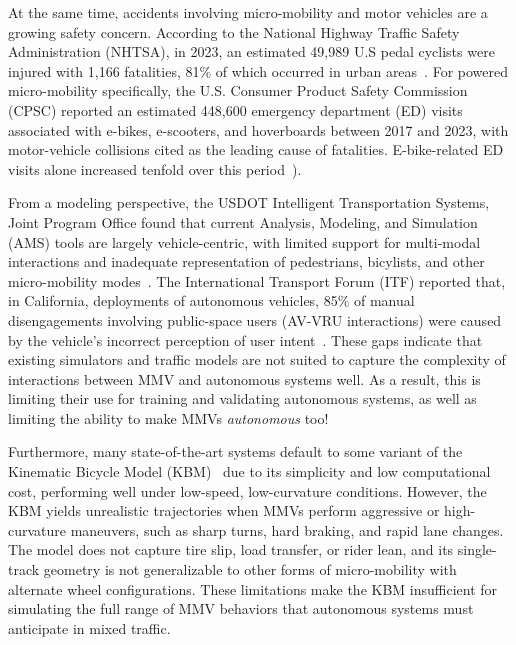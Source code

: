 \documentclass[letterpaper, 10 pt, conference]{ieeeconf}  %
\begin{document}
At the same time, accidents involving micro-mobility and motor vehicles are a growing safety concern. According to the National Highway Traffic Safety Administration (NHTSA), in 2023, an estimated 49,989 U.S pedal cyclists were injured with 1,166 fatalities, 81\% of which occurred in urban areas~\cite{NHTSA2025bicyclists}. For powered micro-mobility specifically, the U.S. Consumer Product Safety Commission (CPSC) reported an estimated 448,600 emergency department (ED) visits associated with e-bikes, e-scooters, and hoverboards between 2017 and 2023, with motor-vehicle collisions cited as the leading cause of fatalities. E-bike-related ED visits alone increased tenfold over this period~\cite{tark2023micromobility}). 

From a modeling perspective, the USDOT Intelligent Transportation Systems, Joint Program Office found that current Analysis, Modeling, and Simulation (AMS) tools are largely vehicle-centric, with limited support for multi-modal interactions and inadequate representation of pedestrians, bicylists, and other micro-mobility modes~\cite{ali2024complete}. The International Transport Forum (ITF) reported that, in California, deployments of autonomous vehicles, 85\% of manual disengagements involving public-space users (AV-VRU interactions) were caused by the vehicle's incorrect perception of user intent~\cite{botero2024lost}. These gaps indicate that existing simulators and traffic models are not suited to capture the complexity of interactions between MMV and autonomous systems well. As a result, this is limiting their use for training and validating autonomous systems, as well as limiting the ability to make MMVs {\em autonomous} too!

Furthermore, many state-of-the-art systems default to some variant of the Kinematic Bicycle Model (KBM)~\cite{mathworksBicycleKinematicModel, autowareMpcLateralController,li2024tactics2d, highwayEnv} due to its simplicity and low computational cost, performing well under low-speed, low-curvature conditions. However, the KBM yields unrealistic trajectories when MMVs perform aggressive or high-curvature maneuvers, such as sharp turns, hard braking, and rapid lane changes. The model does not capture tire slip, load transfer, or rider lean, and its single-track geometry is not generalizable to other forms of micro-mobility with alternate wheel configurations. These limitations make the KBM insufficient for simulating the full range of MMV behaviors that autonomous systems must anticipate in mixed traffic. %
\end{document}
